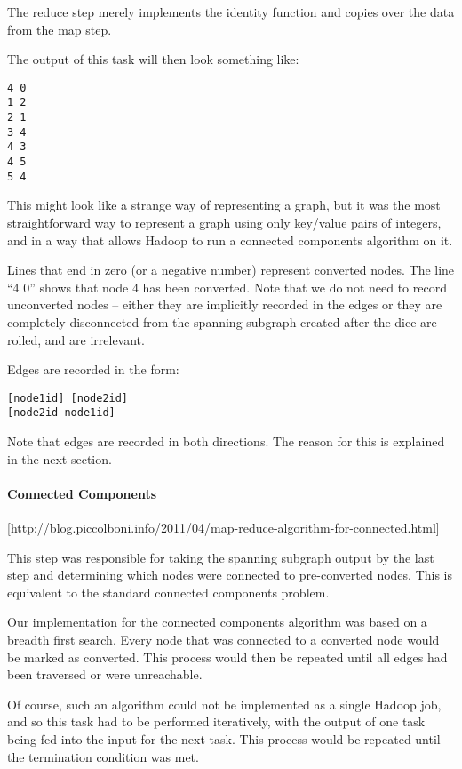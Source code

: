 The reduce step merely implements the identity function and copies over the data from the map step.

The output of this task will then look something like:

\begin{verbatim}
4 0
1 2
2 1
3 4
4 3
4 5
5 4
\end{verbatim}

This might look like a strange way of representing a graph, but it was the most straightforward way to represent a graph using only key/value pairs of integers, and in a way that allows Hadoop to run a connected components algorithm on it.

Lines that end in zero (or a negative number) represent converted nodes. The line ``4 0'' shows that node 4 has been converted. Note that we do not need to record unconverted nodes -- either they are implicitly recorded in the edges or they are completely disconnected from the spanning subgraph created after the dice are rolled, and are irrelevant.

Edges are recorded in the form:

\begin{verbatim}
[node1id] [node2id]
[node2id node1id]
\end{verbatim}

Note that edges are recorded in both directions. The reason for this is explained in the next section.

\paragraph{Connected Components}
[http://blog.piccolboni.info/2011/04/map-reduce-algorithm-for-connected.html]

This step was responsible for taking the spanning subgraph output by the last step and determining which nodes were connected to pre-converted nodes. This is equivalent to the standard connected components problem.

Our implementation for the connected components algorithm was based on a breadth first search. Every node that was connected to a converted node would be marked as converted. This process would then be repeated until all edges had been traversed or were unreachable.

Of course, such an algorithm could not be implemented as a single Hadoop job, and so this task had to be performed iteratively, with the output of one task being fed into the input for the next task. This process would be repeated until the termination condition was met.

